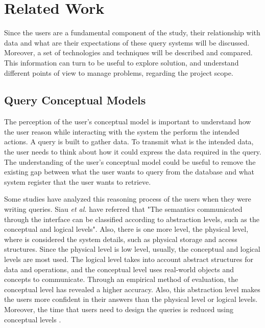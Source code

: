 \chapter{Related Work}
\label{cha:related_work}
Since the users are a fundamental component of the study, their relationship with data and what are their expectations of these query systems will be discussed. Moreover, a set of technologies and techniques will be described and compared. This information can turn to be useful to explore solution, and understand different points of view to manage problems, regarding the project scope. 

\section{Query Conceptual Models}
\label{sec:query_conceptual_models}
The perception of the user's conceptual model is important to understand how the user reason while interacting with the system the perform the intended actions. A query is built to gather data. To transmit what is the intended data, the user needs to think about how it could express the data required in the query. The understanding of the user's conceptual model could be useful to remove the existing gap between what the user wants to query from the database and what system register that the user wants to retrieve.

Some studies have analyzed this reasoning process of the users when they were writing queries. Siau \textit{et al.} \cite{effectsOfQueryComplexityAndLearningOnNoviceUserQueryPerformance} have referred that "The semantics communicated through the interface can be classified according to abstraction levels, such as the conceptual and logical levels". Also, there is one more level, the physical level, where is considered the system details, such as physical storage and access structures. Since the physical level is low level, usually, the conceptual and logical levels are most used. The logical level takes into account abstract structures for data and operations, and the conceptual level uses real-world objects and concepts to communicate. Through an empirical method of evaluation, the conceptual level has revealed a higher accuracy. Also, this abstraction level makes the users more confident in their answers than the physical level or logical levels. Moreover, the time that users need to design the queries is reduced using conceptual levels \cite{effectsOfQueryComplexityAndLearningOnNoviceUserQueryPerformance}.

